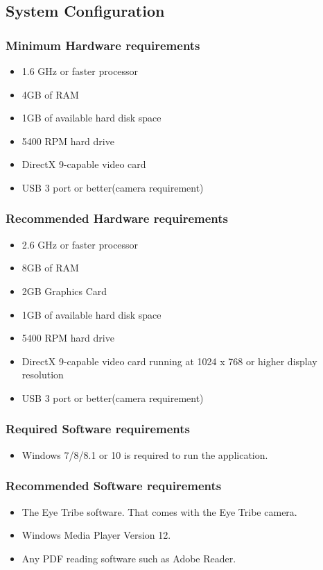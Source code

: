 \subsection{System Configuration}
\subsubsection{Minimum Hardware requirements}
\begin{itemize}
\item 1.6 GHz or faster processor
\item 4GB of RAM
\item 1GB of available hard disk space
\item 5400 RPM hard drive
\item DirectX 9-capable video card
\item USB 3 port or better(camera requirement)
\end{itemize}

\subsubsection{Recommended Hardware requirements}
\begin{itemize}
\item 2.6 GHz or faster processor
\item 8GB of RAM
\item 2GB Graphics Card
\item 1GB of available hard disk space
\item 5400 RPM hard drive
\item DirectX 9-capable video card running at 1024 x 768 or higher display resolution
\item USB 3 port or better(camera requirement)
\end{itemize}
\subsubsection{Required Software requirements}
\begin{itemize}
\item Windows 7/8/8.1 or 10 is required to run the application.
\end{itemize}
\subsubsection{Recommended Software requirements}
\begin{itemize}
\item The Eye Tribe software. That comes with the Eye Tribe camera.
\item Windows Media Player Version 12.
\item Any PDF reading software such as Adobe Reader.
\end{itemize}

